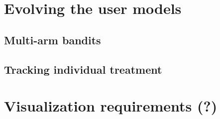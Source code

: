 
\section{Evolving the user models} %
\label{sec:evolving_the_user_models}

\subsection{Multi-arm bandits}

\subsection{Tracking individual treatment}


\section{Visualization requirements (?)} %
\label{sec:visualization_requirements}

